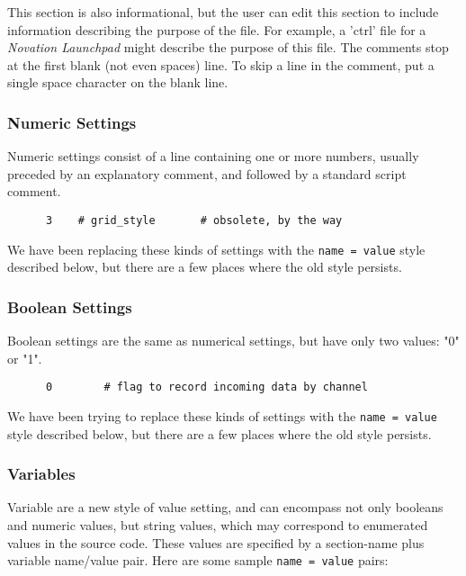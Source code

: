    This section is also informational, but the user can edit this section to
   include information describing the purpose of the file.  For example, a
   'ctrl' file for a \textsl{Novation Launchpad} might describe the purpose of
   this file.  The comments stop at the first blank (not even spaces) line.  To
   skip a line in the comment, put a single space character on the blank line.

\subsubsection{Numeric Settings}
\label{subsec:configuration_common_numeric_settings}

   Numeric settings consist of a line containing one or more numbers, usually
   preceded by an explanatory comment, and followed by a standard script
   comment.

   \begin{verbatim}
      3    # grid_style       # obsolete, by the way
   \end{verbatim}

   We have been replacing these kinds of settings with the
   \texttt{name = value} style described below, but there are a few places
   where the old style persists.

\subsubsection{Boolean Settings}
\label{subsec:configuration_common_boolean_settings}

   Boolean settings are the same as numerical settings, but have only
   two values: "0" or "1".

   \begin{verbatim}
      0        # flag to record incoming data by channel
   \end{verbatim}

   We have been trying to replace these kinds of settings with the
   \texttt{name = value} style described below, but there are a few places
   where the old style persists.

\subsubsection{Variables}
\label{subsec:configuration_common_variables}

   Variable are a new style of value setting, and can encompass not only
   booleans and numeric values, but string values, which may correspond to
   enumerated values in the source code.  These values are specified by a
   section-name plus variable name/value pair.  Here are some sample
   \texttt{name = value} pairs:

